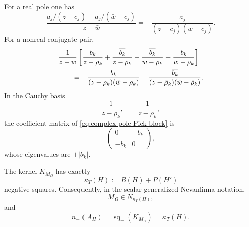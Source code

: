 For a real pole one has
\begin{equation}
\frac{a_j/(z-c_j)-a_j/(\bar w-c_j)}
{z-\bar w}
=
-\frac{a_j}{(z-c_j)(\bar w-c_j)}.
\label{eq:real-pole-Pick-block}
\end{equation}
For a nonreal conjugate pair,
\begin{align}
&\frac{1}{z-\bar w}
\left[
\frac{b_k}{z-\rho_k}
+\frac{\overline{b_k}}{z-\bar\rho_k}
-\frac{\overline{b_k}}{\bar w-\bar\rho_k}
-\frac{b_k}{\bar w-\rho_k}
\right]
\notag\\
&\qquad=
-\frac{b_k}{(z-\rho_k)(\bar w-\rho_k)}
-\frac{\overline{b_k}}
{(z-\bar\rho_k)(\bar w-\bar\rho_k)}.
\label{eq:complex-pole-Pick-block}
\end{align}
In the Cauchy basis
\[
\frac1{z-\rho_k},
\qquad
\frac1{z-\bar\rho_k},
\]
the coefficient matrix of
\eqref{eq:complex-pole-Pick-block} is
\begin{equation}
\begin{pmatrix}
0&-b_k\\
-\overline{b_k}&0
\end{pmatrix},
\label{eq:complex-Pick-signature-block}
\end{equation}
whose eigenvalues are $\pm|b_k|$.

\begin{proposition}
\label{prop:negative-square-encoding}
The kernel $K_{M_\Omega}$ has exactly
\begin{equation}
\boxed{
\kappa_T(H):=B(H)+P(H')
}
\label{eq:kappa-generic-def}
\end{equation}
negative squares.  Consequently, in the scalar generalized-Nevanlinna
notation,
\[
M_\Omega\in N_{\kappa_T(H)},
\]
and
\begin{equation}
\boxed{
n_-(A_H)
=
\operatorname{sq}_-(K_{M_\Omega})
=
\kappa_T(H).
}
\label{eq:AH-negative-squares}
\end{equation}
\end{proposition}

